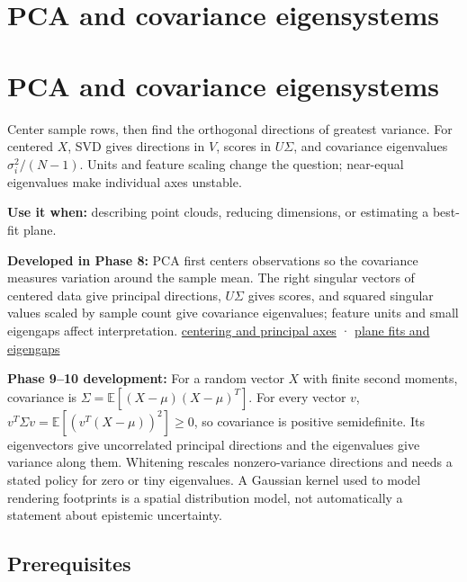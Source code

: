 \hypertarget{appendix-ad175ef3c5bf}{}
\section*{PCA and covariance eigensystems}
\section{PCA and covariance eigensystems}\label{pca-and-covariance-eigensystems}

Center sample rows, then find the orthogonal directions of greatest variance. For centered \(X\), SVD gives directions in \(V\), scores in \(U\Sigma\), and covariance eigenvalues \(\sigma_i^2/(N-1)\). Units and feature scaling change the question; near-equal eigenvalues make individual axes unstable.

\textbf{Use it when:} describing point clouds, reducing dimensions, or estimating a best-fit plane.

\textbf{Developed in Phase 8:} PCA first centers observations so the covariance measures variation around the sample mean. The right singular vectors of centered data give principal directions, \(U\Sigma\) gives scores, and squared singular values scaled by sample count give covariance eigenvalues; feature units and small eigengaps affect interpretation. \href{Continuous\%20Notes/Computing\%20Foundations\%20-\%20From\%20Bits\%20to\%20C++\%20and\%20Systems\%20APIs\#Centered\%20measurements\%20reveal\%20principal\%20directions}{centering and principal axes} · \href{Continuous\%20Notes/Computing\%20Foundations\%20-\%20From\%20Bits\%20to\%20C++\%20and\%20Systems\%20APIs\#Plane\%20fits,\%20eigengaps,\%20and\%20interpretation\%20of\%20uncertain\%20components}{plane fits and eigengaps}

\textbf{Phase 9--10 development:} For a random vector \(X\) with finite second moments, covariance is \(\Sigma=\mathbb E[(X-\mu)(X-\mu)^T]\). For every vector \(v\), \(v^T\Sigma v=\mathbb E[(v^T(X-\mu))^2]\geq0\), so covariance is positive semidefinite. Its eigenvectors give uncorrelated principal directions and the eigenvalues give variance along them. Whitening rescales nonzero-variance directions and needs a stated policy for zero or tiny eigenvalues. A Gaussian kernel used to model rendering footprints is a spatial distribution model, not automatically a statement about epistemic uncertainty.

\subsection{Prerequisites}\label{prerequisites}

